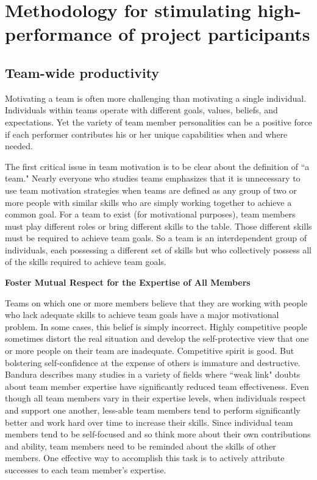 \chapter{Methodology for stimulating high-performance of project participants}
\label{chap:building}

\section{Team-wide productivity}

Motivating a team is often more challenging than motivating a single individual. Individuals within teams operate with different goals, values, beliefs, and expectations. Yet the variety of team member personalities can be a positive force if each performer contributes his or her unique capabilities when and where needed.

The first critical issue in team motivation is to be clear about the definition of ``a team." Nearly everyone who studies teams emphasizes that it is unnecessary to use team motivation strategies when teams are defined as any group of two or more people with similar skills who are simply working together to achieve a common goal. For a team to exist (for motivational purposes), team members must play different roles or bring different skills to the table. Those different skills must be required to achieve team goals. So a team is an interdependent group of individuals, each possessing a different set of skills but who collectively possess all of the skills required to achieve team goals.

\textbf{Foster Mutual Respect for the Expertise of All Members}

Teams on which one or more members believe that they are working with people who lack adequate skills to achieve team goals have a major motivational problem. In some cases, this belief is simply incorrect. Highly competitive people sometimes distort the real situation and develop the self-protective view that one or more people on their team are inadequate. Competitive spirit is good. But bolstering self-confidence at the expense of others is immature and destructive. Bandura describes many studies in a variety of fields where ``weak link" doubts about team member expertise have significantly reduced team effectiveness. Even though all team members vary in their expertise levels, when individuals respect and support one another, less-able team members tend to perform significantly better and work hard over time to increase their skills. Since individual team members tend to be self-focused and so think more about their own contributions and ability, team members need to be reminded about the skills of other members. One effective way to accomplish this task is to actively attribute successes to each team member’s expertise.


